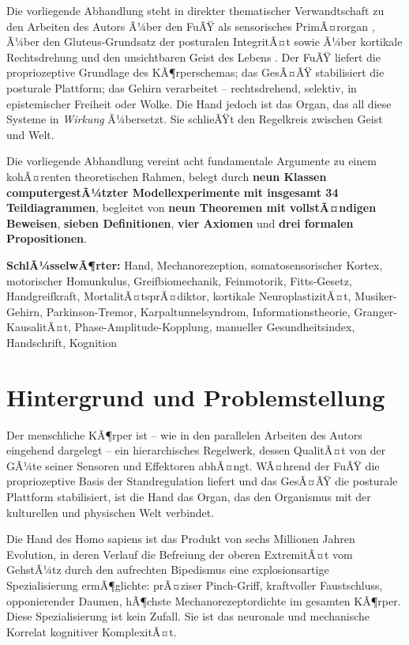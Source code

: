 ﻿\documentclass[12pt,a4paper]{report}
\theoremstyle{plain}
\theoremstyle{definition}
\theoremstyle{remark}
\begin{document}
Die vorliegende Abhandlung steht in direkter thematischer Verwandtschaft
zu den Arbeiten des Autors Ã¼ber den FuÃŸ als sensorisches PrimÃ¤rorgan
\cite{epp2026feed}, Ã¼ber den Gluteus-Grundsatz der posturalen IntegritÃ¤t
\cite{epp2026butt} sowie Ã¼ber kortikale Rechtsdrehung und den unsichtbaren
Geist des Lebens \cite{epp2026brn}. Der FuÃŸ liefert die propriozeptive
Grundlage des KÃ¶rperschemas; das GesÃ¤ÃŸ stabilisiert die posturale Plattform;
das Gehirn verarbeitet -- rechtsdrehend, selektiv, in epistemischer Freiheit
oder Wolke. Die Hand jedoch ist das Organ, das all diese Systeme in
\emph{Wirkung} Ã¼bersetzt. Sie schlieÃŸt den Regelkreis zwischen Geist und Welt.

Die vorliegende Abhandlung vereint acht fundamentale Argumente zu einem
kohÃ¤renten theoretischen Rahmen, belegt durch \textbf{neun Klassen
computergestÃ¼tzter Modellexperimente mit insgesamt 34 Teildiagrammen},
begleitet von \textbf{neun Theoremen mit vollstÃ¤ndigen Beweisen},
\textbf{sieben Definitionen}, \textbf{vier Axiomen} und
\textbf{drei formalen Propositionen}.

\textbf{SchlÃ¼sselwÃ¶rter:}
Hand, Mechanorezeption, somatosensorischer Kortex, motorischer Homunkulus,
Greifbiomechanik, Feinmotorik, Fitts-Gesetz, Handgreifkraft, MortalitÃ¤tsprÃ¤diktor,
kortikale NeuroplastizitÃ¤t, Musiker-Gehirn, Parkinson-Tremor,
Karpaltunnelsyndrom, Informationstheorie, Granger-KausalitÃ¤t,
Phase-Amplitude-Kopplung, manueller Gesundheitsindex, Handschrift, Kognition

\section{Hintergrund und Problemstellung}

Der menschliche KÃ¶rper ist -- wie in den parallelen Arbeiten des Autors
eingehend dargelegt -- ein hierarchisches Regelwerk, dessen QualitÃ¤t
von der GÃ¼te seiner Sensoren und Effektoren abhÃ¤ngt. WÃ¤hrend der FuÃŸ
\cite{epp2026feed} die propriozeptive Basis der Standregulation liefert
und das GesÃ¤ÃŸ \cite{epp2026butt} die posturale Plattform stabilisiert,
ist die Hand das Organ, das den Organismus mit der kulturellen und
physischen Welt verbindet.

Die Hand des Homo sapiens ist das Produkt von sechs Millionen Jahren
Evolution, in deren Verlauf die Befreiung der oberen ExtremitÃ¤t vom
GehstÃ¼tz durch den aufrechten Bipedismus eine explosionsartige
Spezialisierung ermÃ¶glichte: prÃ¤ziser Pinch-Griff, kraftvoller
Faustschluss, opponierender Daumen, hÃ¶chste Mechanorezeptordichte im
gesamten KÃ¶rper. Diese Spezialisierung ist kein Zufall. Sie ist das
neuronale und mechanische Korrelat kognitiver KomplexitÃ¤t.
\end{document}
